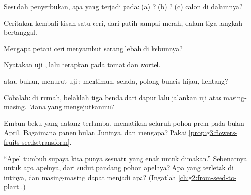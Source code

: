 \begin{exercise}[$\star$]\label{exo:g3:flowers-fruits-seeds:3}
Sesudah penyerbukan, apa yang terjadi pada: (a) ? (b)
? (c) calon  di dalamnya?
\end{exercise}

\begin{exercise}[$\star$]\label{exo:g3:flowers-fruits-seeds:4}
Ceritakan kembali kisah satu  ceri, dari  putih sampai 
merah, dalam tiga langkah bertanggal.
\end{exercise}

\begin{exercise}[$\star$]\label{exo:g3:flowers-fruits-seeds:5}
Mengapa petani ceri menyambut sarang lebah di kebunnya?
\end{exercise}

\begin{exercise}[$\star$]\label{exo:g3:flowers-fruits-seeds:6}
Nyatakan uji , lalu terapkan pada tomat dan wortel.
\end{exercise}

\begin{exercise}[$\star$]\label{exo:g3:flowers-fruits-seeds:7}
 atau bukan, menurut uji : mentimun, selada, polong buncis
hijau, kentang?
\end{exercise}

\begin{exercise}[$\star$]\label{exo:g3:flowers-fruits-seeds:8}
Cobalah: di rumah, belahlah tiga benda dari dapur lalu jalankan uji
 atas masing-masing. Mana yang mengejutkanmu?
\end{exercise}

\begin{exercise}[$\star\star$]\label{exo:g3:flowers-fruits-seeds:9}
Embun beku yang datang terlambat mematikan seluruh  pohon prem
pada bulan April. Bagaimana panen bulan Juninya, dan mengapa? Pakai
\cref{prop:g3:flowers-fruits-seeds:transform}.
\end{exercise}

\begin{exercise}[$\star\star$]\label{exo:g3:flowers-fruits-seeds:10}
``Apel tumbuh supaya kita punya sesuatu yang enak untuk dimakan.''
Sebenarnya untuk apa apelnya, dari sudut pandang pohon apelnya? Apa
yang terletak di intinya, dan masing-masing dapat menjadi apa?
(Ingatlah \cref{ch:g2:from-seed-to-plant}.)
\end{exercise}

